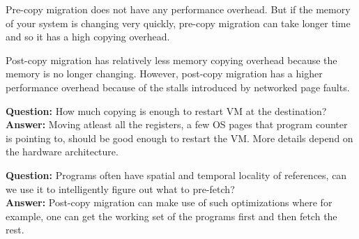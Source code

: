 \documentclass[twoside]{article}
\begin{document}
Pre-copy migration does not have any performance overhead. But if the memory of your system is changing very quickly, pre-copy migration can take longer time and so it has a high copying overhead.

Post-copy migration has relatively less memory copying overhead because the memory is no longer changing. However, post-copy migration has a higher performance overhead because of the stalls introduced by networked page faults.  

\textbf{Question:} How much copying is enough to restart VM at the destination?
\\ \textbf{Answer:} Moving atleast all the registers, a few OS pages that program counter is pointing to, should be good enough to restart the VM. More details depend on the hardware architecture. 

\textbf{Question:} Programs often have spatial and temporal locality of references, can we use it to intelligently figure out what to pre-fetch?
\\ \textbf{Answer:} Post-copy migration can make use of such optimizations where for example, one can get the working set of the programs first and then fetch the rest.
\end{document}
